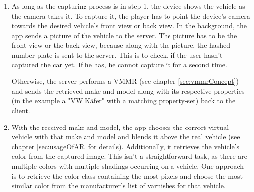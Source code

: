 \begin{enumerate}
  \item As long as the capturing process is in step 1, the device shows the vehicle as the camera takes it. To capture it, the player has to point the device's camera towards the desired vehicle's front view or back view. In the background, the app sends a picture of the vehicle to the server. The picture has to be the front view or the back view, because along with the picture, the hashed number plate is sent to the server. This is to check, if the user hasn't captured the car yet. If he has, he cannot capture it for a second time.

Otherwise, the server performs a VMMR (see chapter \ref{sec:vmmrConcept}) and sends the retrieved make and model along with its respective properties (in the example a "VW K\"afer" with a matching property-set) back to the client.
  \item With the received make and model, the app chooses the correct virtual vehicle with that make and model and blends it above the real vehicle (see chapter \ref{sec:usageOfAR} for details). Additionally, it retrieves the vehicle's color from the captured image. This isn't a straightforward task, as there are multiple colors with multiple shadings occurring on a vehicle. One approach is to retrieve the color class containing the most pixels and choose the most similar color from the manufacturer's list of varnishes for that vehicle.


\end{enumerate}
